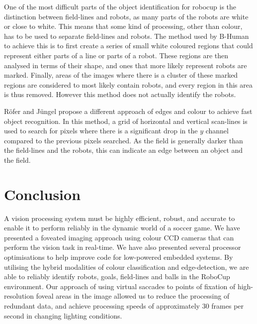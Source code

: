 \documentclass[runningheads,a4paper]{llncs}
\begin{document}
One of the most difficult parts of the object identification for robocup is the
distinction between field-lines and robots, as many parts of the robots are
white or close to white. This means that some kind of processing, other than
colour, has to be used to separate field-lines and robots. The method used by
B-Human\cite{thomas09code} to achieve this is to first create a series of small
white coloured regions that could represent either parts of a line or parts of a
robot. These regions are then analysed in terms of their shape, and ones that
more likely represent robots are marked. Finally, areas of the images where
there is a cluster of these marked regions are considered to most likely contain
robots, and every region in this area is thus removed. However this method does
not actually identify the robots.

R\"{o}fer and J\"{u}ngel\cite{rofer2004fast} propose a different approach of
edges and colour to achieve fast object recognition. In this method, a grid of
horizontal and vertical scan-lines is used to search for pixels where there is a
significant drop in the $y$ channel compared to the previous pixels searched. As
the field is generally darker than the field-lines and the robots, this can
indicate an edge between an object and the field. 

\section{Conclusion}

A vision processing system must be highly efficient, robust, and accurate to
enable it to perform reliably in the dynamic world of a soccer game. We have
presented a foveated imaging approach  using colour CCD cameras that can perform
the vision task in real-time. We have also presented several processor
optimisations to help improve code for low-powered embedded systems. By
utilising the hybrid modalities of colour classification and edge-detection, we
are able to reliably identify robots, goals, field-lines and balls in the
RoboCup environment. Our approach of using virtual saccades to points of
fixation of high-resolution foveal areas in the image allowed us to reduce the
processing of redundant data, and achieve processing speeds of approximately 30
frames per second in changing lighting conditions.

\small


\end{document}
